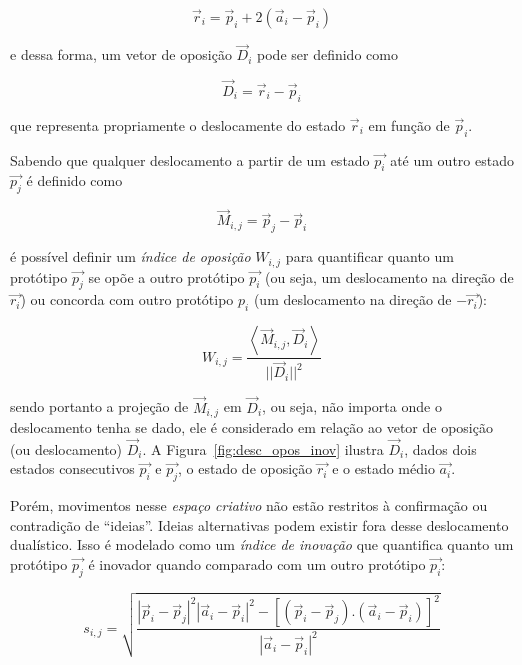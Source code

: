 \begin{equation}
\vec{r}_i = \vec{p}_i + 2(\vec{a}_i - \vec{p}_i)
\end{equation}

\noindent e dessa forma, um vetor de oposição $\vec{D}_i$ pode ser definido como

\begin{equation}
\vec{D}_i=\vec{r}_i - \vec{p}_i
\end{equation}

\noindent que representa propriamente o deslocamente do estado $\vec{r}_i$ em
função de $\vec{p}_i$.

Sabendo que qualquer deslocamento a partir de um estado $\vec{p_i}$ até um outro
estado $\vec{p_j}$ é definido como

\begin{equation}
\vec{M}_{i,j} = \vec{p}_j - \vec{p}_i
\end{equation}

\noindent é possível definir um \emph{índice de oposição} $W_{i,j}$ para
quantificar quanto um protótipo $\vec{p_j}$ se opõe a outro protótipo $\vec{p_i}$ (ou seja,
um deslocamento na direção de $\vec{r_i}$) ou concorda com outro protótipo $p_i$
(um deslocamento na direção de $-\vec{r_i}$):

\begin{equation}
W_{i,j} = \frac{\left< \vec{M}_{i,j}, \vec{D}_i\right>}{||\vec{D}_i||^2}
\end{equation}

\noindent sendo portanto a projeção de $\vec{M}_{i,j}$ em $\vec{D}_i$, ou seja,
não importa onde o deslocamento tenha se dado, ele é considerado em relação ao
vetor de oposição (ou deslocamento) $\vec{D}_i$. A
Figura~\ref{fig:desc_opos_inov} ilustra $\vec{D}_i$, dados dois estados
consecutivos $\vec{p_i}$ e $\vec{p_j}$, o estado de oposição $\vec{r_i}$ e o
estado médio $\vec{a_i}$.

Porém, movimentos nesse \textit{espaço criativo} não estão restritos à
confirmação ou contradição de ``ideias''. Ideias alternativas podem existir fora
desse deslocamento dualístico. Isso é modelado como um \emph{índice de inovação}
que quantifica quanto um protótipo $\vec{p_j}$ é inovador quando comparado com um
outro protótipo $\vec{p_i}$:


\begin{equation}
s_{i,j} = \sqrt{\frac{|\vec{p}_i-\vec{p}_j|^2
          |\vec{a}_i-\vec{p}_i|^2 - 
          [(\vec{p}_i-\vec{p}_j) . 
            (\vec{a}_i-\vec{p}_i)]^2}
        {|\vec{a}_i-\vec{p}_i|^2}}
\end{equation}

